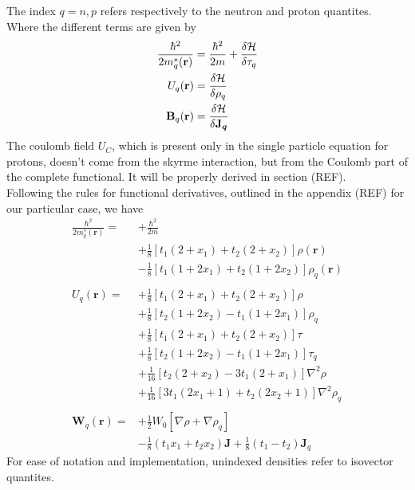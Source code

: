 The index $q=n,p$ refers respectively to the neutron and proton quantites.
\\Where the different terms are given by
\begin{align}
    \frac{\hbar^2}{2m^{*}_q(\mathbf r)} &= \frac{\hbar^2}{2m}+\fdv{\mathcal H}{\tau_q}
    \\U_q(\mathbf r) &= \fdv{\mathcal H}{\rho_q}
    \\\mathbf B_q(\mathbf r) &= \fdv{\mathcal H}{\boldsymbol{\mathbf J_q}}
\end{align}
The coulomb field $U_C$, which is present only in the single particle equation for protons, doesn't come from the skyrme interaction, but from the Coulomb part of the complete functional. It will be properly derived in section (REF).
\\Following the rules for functional derivatives, outlined in the appendix (REF) for our particular case, we have
\begin{align}
    \frac{\hbar^2}{2m_q^*(\mathbf r)} =& +\frac{\hbar^2}{2m} \\&+ \frac 1 8 [t_1(2+x_1)+t_2(2+x_2)]\rho(\mathbf r) \\&- \frac 1 8 [t_1(1+2x_1)+t_2(1+2x_2)]\rho_q(\mathbf r ) \\\\
    U_q(\mathbf r) =& +\frac 1 8 [t_1(2+x_1)+t_2(2+x_2)]\rho \\&+ \frac 1 8 [t_2(1+2x_2)-t_1(1+2x_1)]\rho_q \\
    &+ \frac 1 8 [t_1(2+x_1)+t_2(2+x_2)]\tau \\&+ \frac 1 8 [t_2(1+2x_2)-t_1(1+2x_1)]\tau_q \\
    &+ \frac 1 {16} [t_2(2+x_2)-3t_1(2+x_1)] \nabla^2 \rho \\&+ \frac 1 {16} [3t_1(2x_1+1)+t_2(2x_2+1)] \nabla^2 \rho_q \\\\
    \mathbf W_q (\mathbf r ) = &+\frac 1 2 W_0 [\nabla\rho + \nabla \rho_q] \\&-\frac 1 8 (t_1 x_1 + t_2 x_2) \mathbf J + \frac 1 8 (t_1 - t_2) \mathbf J_q 
\end{align}
For ease of notation and implementation, unindexed densities refer to isovector quantites.